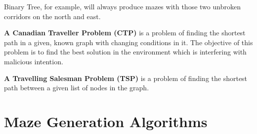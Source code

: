  Binary Tree, for example, will always produce mazes with those two unbroken corridors on the north and east.
\begin{definition}\textbf{A Canadian Traveller Problem (CTP)} is a problem of finding the shortest path in a given, known graph with changing conditions in it. The objective of this problem is to find the best solution in the environment which is interfering with malicious intention.\end{definition}
\begin{definition}\textbf{A Travelling Salesman Problem (TSP)} is a problem of finding the shortest path between a given list of nodes in the graph. \end{definition}

\section{Maze Generation Algorithms}
